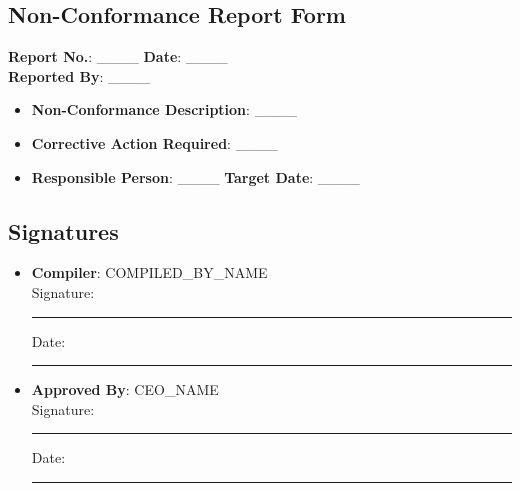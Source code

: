 \documentclass[11pt]{article}
\newcommand{\compilerName}{{{COMPILED_BY_NAME}}}
\begin{document}
\subsection*{Non-Conformance Report Form}

\textbf{Report No.}: \_\_\_\_ \textbf{Date}: \_\_\_\_ \\
\textbf{Reported By}: \_\_\_\_

\begin{itemize}
    \item \textbf{Non-Conformance Description}: \_\_\_\_
    \item \textbf{Corrective Action Required}: \_\_\_\_
    \item \textbf{Responsible Person}: \_\_\_\_ \textbf{Target Date}: \_\_\_\_
\end{itemize}

\subsection*{Signatures}
\begin{itemize}
  \item \textbf{Compiler}: \compilerName \\
    Signature: \rule{5cm}{0.4pt} \quad Date: \rule{3cm}{0.4pt}
  \item \textbf{Approved By}: {{CEO_NAME}} \\
    Signature: \rule{5cm}{0.4pt} \quad Date: \rule{3cm}{0.4pt}
\end{itemize}
\end{document}
